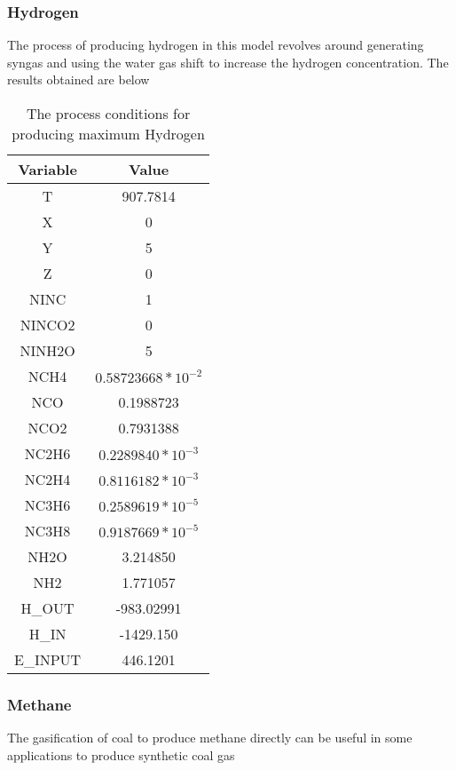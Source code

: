 \documentclass[journal=iecred,manuscript=article]{achemso}
\begin{document}
\subsubsection{Hydrogen}
The process of producing hydrogen  in this model revolves around generating syngas and using the water gas shift to increase the hydrogen concentration. The results obtained are below  
\FloatBarrier
\begin{table}[H]
\caption{The process conditions for producing maximum Hydrogen} 
\centering
\begin{tabular}{|c|c|}
\hline\hline %
Variable & Value \\ 
[1ex] %
\hline %
T	& 907.7814 \\
\hline
X	 & 0 \\
\hline
Y	& 5 \\
\hline
Z	&  0 \\
\hline
NINC	& 1 \\
\hline
NINCO2	& 0 \\
\hline
NINH2O	&  5 \\
\hline
NCH4 &	 $0.58723668*10^{-2}$ \\
\hline
NCO	& 0.1988723  \\
\hline
NCO2	& 0.7931388  \\
\hline
NC2H6	& $0.2289840*10^{-3}$ \\
\hline
NC2H4	& $0.8116182*10^{-3}$ \\
\hline
NC3H6	& $0.2589619*10^{-5}$ \\
\hline
NC3H8	& $0.9187669*10^{-5}$ \\
\hline
NH2O	& 3.214850   \\
\hline
NH2 & 1.771057  \\
\hline
H_{OUT}	& -983.02991  \\
\hline
H_{IN}	& -1429.150   \\
\hline
E_{INPUT}	& 446.1201 \\
\hline 
\end{tabular}
\end{table}
\FloatBarrier

\newpage
\subsubsection{Methane}
The gasification of coal to produce methane directly can be useful in some applications to produce synthetic coal gas
\end{document}
